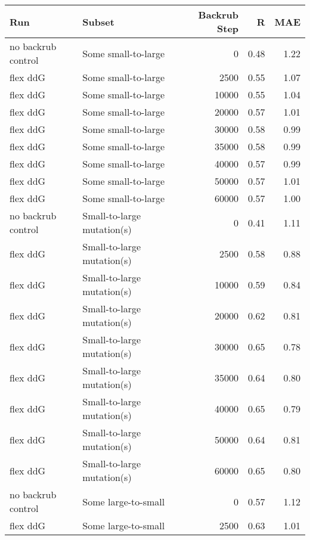 \begin{table}
\begin{tabular}{llrrr}
\toprule
                Run &                      Subset &  Backrub Step &    R &  MAE \\
\midrule
 no backrub control &         Some small-to-large &             0 & 0.48 & 1.22 \\
           flex ddG &         Some small-to-large &          2500 & 0.55 & 1.07 \\
           flex ddG &         Some small-to-large &         10000 & 0.55 & 1.04 \\
           flex ddG &         Some small-to-large &         20000 & 0.57 & 1.01 \\
           flex ddG &         Some small-to-large &         30000 & 0.58 & 0.99 \\
           flex ddG &         Some small-to-large &         35000 & 0.58 & 0.99 \\
           flex ddG &         Some small-to-large &         40000 & 0.57 & 0.99 \\
           flex ddG &         Some small-to-large &         50000 & 0.57 & 1.01 \\
           flex ddG &         Some small-to-large &         60000 & 0.57 & 1.00 \\
 no backrub control &  Small-to-large mutation(s) &             0 & 0.41 & 1.11 \\
           flex ddG &  Small-to-large mutation(s) &          2500 & 0.58 & 0.88 \\
           flex ddG &  Small-to-large mutation(s) &         10000 & 0.59 & 0.84 \\
           flex ddG &  Small-to-large mutation(s) &         20000 & 0.62 & 0.81 \\
           flex ddG &  Small-to-large mutation(s) &         30000 & 0.65 & 0.78 \\
           flex ddG &  Small-to-large mutation(s) &         35000 & 0.64 & 0.80 \\
           flex ddG &  Small-to-large mutation(s) &         40000 & 0.65 & 0.79 \\
           flex ddG &  Small-to-large mutation(s) &         50000 & 0.64 & 0.81 \\
           flex ddG &  Small-to-large mutation(s) &         60000 & 0.65 & 0.80 \\
 no backrub control &         Some large-to-small &             0 & 0.57 & 1.12 \\
           flex ddG &         Some large-to-small &          2500 & 0.63 & 1.01 \\

\end{tabular}
\end{table}
